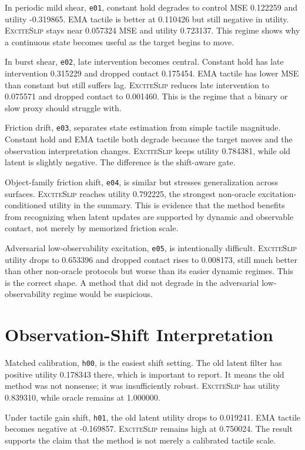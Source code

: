 \documentclass{article}
\newcommand{\method}{\textsc{ExciteSlip}\xspace}
\begin{document}
In periodic mild shear, \texttt{e01}, constant hold degrades to control MSE 0.122259 and utility -0.319865. EMA tactile is better at 0.110426 but still negative in utility. \method stays near 0.057324 MSE and utility 0.723137. This regime shows why a continuous state becomes useful as the target begins to move.

In burst shear, \texttt{e02}, late intervention becomes central. Constant hold has late intervention 0.315229 and dropped contact 0.175454. EMA tactile has lower MSE than constant but still suffers lag. \method reduces late intervention to 0.075571 and dropped contact to 0.001460. This is the regime that a binary or slow proxy should struggle with.

Friction drift, \texttt{e03}, separates state estimation from simple tactile magnitude. Constant hold and EMA tactile both degrade because the target moves and the observation interpretation changes. \method keeps utility 0.784381, while old latent is slightly negative. The difference is the shift-aware gate.

Object-family friction shift, \texttt{e04}, is similar but stresses generalization across surfaces. \method reaches utility 0.792225, the strongest non-oracle excitation-conditioned utility in the summary. This is evidence that the method benefits from recognizing when latent updates are supported by dynamic and observable contact, not merely by memorized friction scale.

Adversarial low-observability excitation, \texttt{e05}, is intentionally difficult. \method utility drops to 0.653396 and dropped contact rises to 0.008173, still much better than other non-oracle protocols but worse than its easier dynamic regimes. This is the correct shape. A method that did not degrade in the adversarial low-observability regime would be suspicious.

\section{Observation-Shift Interpretation}

Matched calibration, \texttt{h00}, is the easiest shift setting. The old latent filter has positive utility 0.178343 there, which is important to report. It means the old method was not nonsense; it was insufficiently robust. \method has utility 0.839310, while oracle remains at 1.000000.

Under tactile gain shift, \texttt{h01}, the old latent utility drops to 0.019241. EMA tactile becomes negative at -0.169857. \method remains high at 0.750024. The result supports the claim that the method is not merely a calibrated tactile scale.
\end{document}
